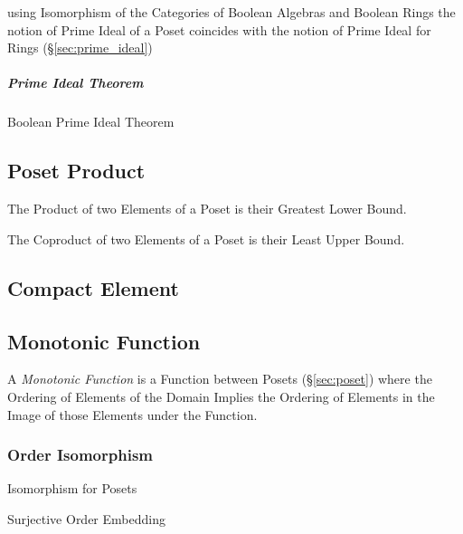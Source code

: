 \fist using Isomorphism of the Categories of Boolean Algebras and Boolean Rings
the notion of Prime Ideal of a Poset coincides with the notion of Prime Ideal
for Rings (\S\ref{sec:prime_ideal})



\subparagraph{Prime Ideal Theorem}\label{sec:prime_ideal_theorem}\hfill

Boolean Prime Ideal Theorem



\subsection{Poset Product}\label{sec:poset_product}

The Product of two Elements of a Poset is their Greatest Lower Bound.

The Coproduct of two Elements of a Poset is their Least Upper Bound.



\subsection{Compact Element}\label{sec:compact_element}

\subsection{Monotonic Function}\label{sec:monotonic_function}

A \emph{Monotonic Function} is a Function between Posets
(\S\ref{sec:poset}) where the Ordering of Elements of the Domain
Implies the Ordering of Elements in the Image of those Elements under
the Function.



\subsubsection{Order Isomorphism}\label{sec:order_isomorphism}

Isomorphism for Posets

Surjective Order Embedding

